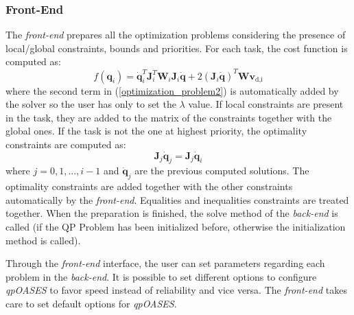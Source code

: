 \subsubsection{Front-End}
The \emph{front-end} prepares all the optimization problems considering the presence of local/global constraints, bounds and priorities. For each task, the cost function is computed as:
\begin{equation}
f(\mathbf{q}_i) = \dot{\mathbf{q}}_i^T\mathbf{J}_i^T\mathbf{W}_i\mathbf{J}_i\dot{\mathbf{q}} + 2(\mathbf{J}_i\dot{\mathbf{q}})^T\mathbf{W}\mathbf{v}_\text{d,i}
\label{cost_function}
\end{equation}
where the second term in (\ref{optimization_problem2}) is automatically added by the solver so the user has only to set the $\lambda$ value. If local constraints are present in the task, they are added to the matrix of the constraints together with the global ones. If the task is not the one at highest priority, the optimality constraints are computed as:
\begin{equation}
\mathbf{J}_{j}\dot{\mathbf{q}}_{j} = \mathbf{J}_{j}\dot{\mathbf{q}}_i
\label{optimality_constraints}
\end{equation}
where $j = 0, 1, ..., i-1$ and $\dot{\mathbf{q}}_{j}$ are the previous computed solutions. The optimality constraints are added together with the other constraints automatically by the \emph{front-end}. Equalities and inequalities constraints are treated together. When the preparation is finished, the solve method of the \emph{back-end} is called (if the QP Problem has been initialized before, otherwise the initialization method is called).


Through the \emph{front-end} interface, the user can set parameters regarding each problem in the \emph{back-end}. It is possible to set different options to configure \emph{qpOASES} to favor speed instead of reliability and vice versa. The \emph{front-end} takes care to set default options for \emph{qpOASES}.  


